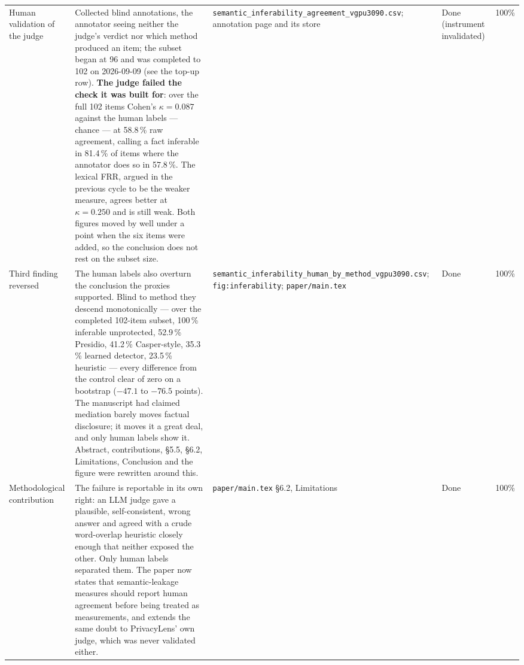 \documentclass[11pt]{article}
\begin{document}
\begin{longtable}{p{}p{}p{}p{}p{}}
Human validation of the judge & Collected blind annotations, the annotator seeing neither the judge's verdict nor which method produced an item; the subset began at 96 and was completed to 102 on 2026-09-09 (see the top-up row). \textbf{The judge failed the check it was built for}: over the full 102 items Cohen's $\kappa=0.087$ against the human labels --- chance --- at 58.8\,\% raw agreement, calling a fact inferable in 81.4\,\% of items where the annotator does so in 57.8\,\%. The lexical FRR, argued in the previous cycle to be the weaker measure, agrees better at $\kappa=0.250$ and is still weak. Both figures moved by well under a point when the six items were added, so the conclusion does not rest on the subset size. & \texttt{semantic\_inferability\_agreement\_vgpu3090.csv}; annotation page and its store & Done (instrument invalidated) & 100\% \\
Third finding reversed & The human labels also overturn the conclusion the proxies supported. Blind to method they descend monotonically --- over the completed 102-item subset, 100\,\% inferable unprotected, 52.9\,\% Presidio, 41.2\,\% Casper-style, 35.3\,\% learned detector, 23.5\,\% heuristic --- every difference from the control clear of zero on a bootstrap ($-47.1$ to $-76.5$ points). The manuscript had claimed mediation barely moves factual disclosure; it moves it a great deal, and only human labels show it. Abstract, contributions, \S5.5, \S6.2, Limitations, Conclusion and the figure were rewritten around this. & \texttt{semantic\_inferability\_human\_by\_method\_vgpu3090.csv}; \texttt{fig:inferability}; \texttt{paper/main.tex} & Done & 100\% \\
Methodological contribution & The failure is reportable in its own right: an LLM judge gave a plausible, self-consistent, wrong answer and agreed with a crude word-overlap heuristic closely enough that neither exposed the other. Only human labels separated them. The paper now states that semantic-leakage measures should report human agreement before being treated as measurements, and extends the same doubt to PrivacyLens' own judge, which was never validated either. & \texttt{paper/main.tex} \S6.2, Limitations & Done & 100\% \\

\end{longtable}
\end{document}
